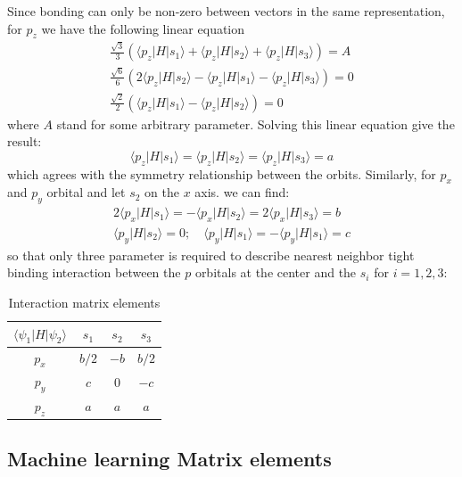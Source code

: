 \documentclass{article}
\begin{document}
Since bonding can only be non-zero between vectors in the same representation, for $p_z$ we have
the following linear equation
\begin{align*}
    \frac{\sqrt{3}}{3} (\langle p_z | H | s_1 \rangle + \langle p_z | H | s_2 \rangle + \langle p_z | H | s_3 \rangle) = A \\
    \frac{\sqrt{6}}{6} (2\langle p_z | H | s_2 \rangle - \langle p_z | H | s_1 \rangle - \langle p_z | H | s_3 \rangle) = 0 \\
    \frac{\sqrt{2}}{2} ( \langle p_z | H | s_1 \rangle - \langle p_z | H | s_2 \rangle) = 0
\end{align*}
where $A$ stand for some arbitrary parameter. Solving this linear 
equation give the result:
\begin{equation}
    \langle p_z | H | s_1 \rangle = \langle p_z | H | s_2 \rangle = \langle p_z | H | s_3 \rangle = a
\end{equation}
which agrees with the symmetry relationship between the orbits.
Similarly, for $p_x$ and $p_y$ orbital and let $s_2$ on the $x$ axis. we can find:
\begin{gather}
    2 \langle p_x | H | s_1 \rangle = - \langle p_x | H | s_2 \rangle = 2 \langle p_x | H | s_3 \rangle = b \\
    \langle p_y | H | s_2 \rangle = 0;\quad \langle p_y | H | s_1 \rangle = - \langle p_y | H | s_1 \rangle = c
\end{gather}
so that only three parameter is required to describe nearest neighbor tight binding interaction between the 
$p$ orbitals at the center and the $s_i$ for $i = 1,2,3$:
\begin{table}[h]
    \caption{Interaction matrix elements}
    \label{T:interaction_D_3h}
    \centering
    \begin{tabular}{|c|ccc|}
        \hline
        $\langle \psi_1 | H | \psi_2 \rangle$ & $s_1$ & $s_2$ & $s_3$ \\ \hline
        $p_x$ & $b/2$ & $-b$ & $b/2$ \\
        $p_y$ & $c$ & $0$ & $-c$\\
        $p_z$ & $a$ & $a$ & $a$ \\
        \hline
    \end{tabular}
\end{table}


\subsection{Machine learning Matrix elements}
\end{document}

